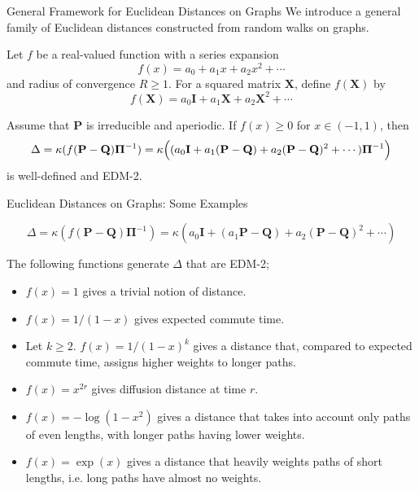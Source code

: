 \documentclass[professionalfonts, hyperref={pdfpagelabels=false,
  colorlinks=true, linkcolor=purple}]{beamer}
\begin{document}
\begin{frame}{General Framework for Euclidean Distances on Graphs}
  We introduce a general family of Euclidean distances constructed
  from random walks on graphs. 
  
  \vskip10pt Let $f$ be a real-valued function with a
    series expansion
    \begin{equation*}
      f(x) = a_0 + a_1 x + a_2 x^2 + \cdots
    \end{equation*}
    and radius of convergence $R \geq 1$. For a squared matrix
    $\mathbf{X}$, define $f(\mathbf{X})$ by
    \begin{equation*}
      f(\mathbf{X}) = a_0 \mathbf{I} + a_1 \mathbf{X} + a_2
      \mathbf{X}^{2} + \cdots
    \end{equation*}
    \begin{alertblock}{}
      Assume that $\mathbf{P}$ is irreducible and aperiodic. If $f(x)
      \geq 0$ for $x \in (-1,1)$, then
      \begin{equation}
        \Delta = \kappa(f(\mathbf{P} - \mathbf{Q})
        \bm{\Pi}^{-1}) =
        \kappa\Bigl((a_0
        \mathbf{I} + a_1 (\mathbf{P} - \mathbf{Q}) + a_2 (\mathbf{P} -
        \mathbf{Q})^2 + \cdots)\bm{\Pi}^{-1}\Bigr)
      \end{equation}
      is well-defined and EDM-2. 
      \end{alertblock}
\end{frame}

\begin{frame}{Euclidean Distances on Graphs: Some Examples}
  \begin{alertblock}{}
    \begin{equation*}
        \Delta = \kappa(f(\mathbf{P} - \mathbf{Q}) \bm{\Pi}^{-1}) =
        \kappa(a_0 \mathbf{I} + (a_1 \mathbf{P} - \mathbf{Q}) + a_2
        (\mathbf{P} - \mathbf{Q})^2 + \cdots)
    \end{equation*}
  \end{alertblock}
  \vskip 10pt The following functions generate $\Delta$ that are
  EDM-2;
  \begin{itemize}
  \item $f(x) = 1$ gives a trivial notion of distance.
  \item $f(x) = 1/(1-x)$ gives expected commute time.
  \item Let $k \geq 2$. $f(x) = 1/(1-x)^k$ gives a distance that,
    compared to expected commute time, assigns higher weights to
    longer paths.
  \item $f(x) = x^{2r}$ gives diffusion distance at time $r$.
  \item $f(x) = - \log{(1-x^2)}$ gives a distance that 
    takes into account only paths of even lengths, with longer paths having
    lower weights.
  \item $f(x) = \exp(x)$ gives a distance that heavily weights paths
    of short lengths, i.e. long paths have almost
    no weights.
  \end{itemize}
  \end{frame}
\end{document}
